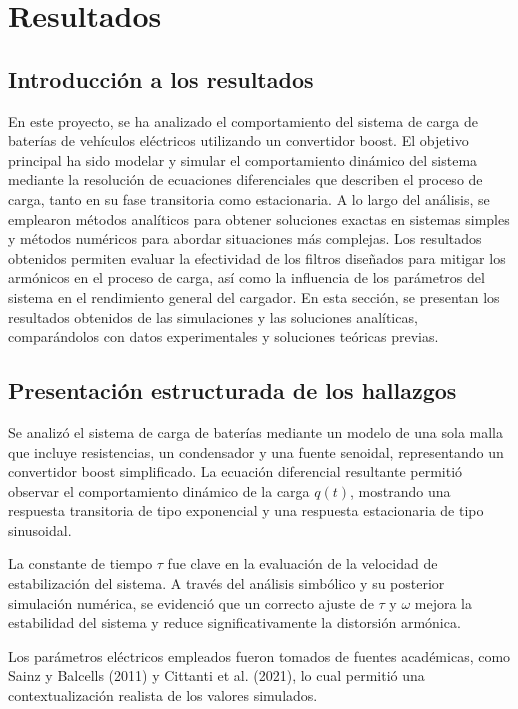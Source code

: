 \section{Resultados}

\subsection{Introducción a los resultados}
En este proyecto, se ha analizado el comportamiento del sistema de carga de baterías de vehículos eléctricos utilizando un convertidor boost. El objetivo principal ha sido modelar y simular el comportamiento dinámico del sistema mediante la resolución de ecuaciones diferenciales que describen el proceso de carga, tanto en su fase transitoria como estacionaria. A lo largo del análisis, se emplearon métodos analíticos para obtener soluciones exactas en sistemas simples y métodos numéricos para abordar situaciones más complejas. Los resultados obtenidos permiten evaluar la efectividad de los filtros diseñados para mitigar los armónicos en el proceso de carga, así como la influencia de los parámetros del sistema en el rendimiento general del cargador. En esta sección, se presentan los resultados obtenidos de las simulaciones y las soluciones analíticas, comparándolos con datos experimentales y soluciones teóricas previas.

\subsection{Presentación estructurada de los hallazgos}
Se analizó el sistema de carga de baterías mediante un modelo de una sola malla que incluye resistencias, un condensador y una fuente senoidal, representando un convertidor boost simplificado. La ecuación diferencial resultante permitió observar el comportamiento dinámico de la carga \( q(t) \), mostrando una respuesta transitoria de tipo exponencial y una respuesta estacionaria de tipo sinusoidal.

La constante de tiempo \( \tau \) fue clave en la evaluación de la velocidad de estabilización del sistema. A través del análisis simbólico y su posterior simulación numérica, se evidenció que un correcto ajuste de \( \tau \) y \( \omega \) mejora la estabilidad del sistema y reduce significativamente la distorsión armónica.

Los parámetros eléctricos empleados fueron tomados de fuentes académicas, como Sainz y Balcells (2011) y Cittanti et al. (2021), lo cual permitió una contextualización realista de los valores simulados.

